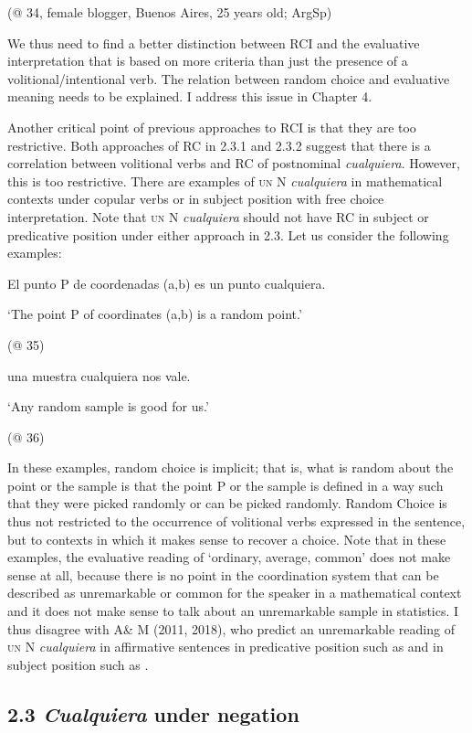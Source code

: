 \documentclass[output=paper]{langscibook}
\begin{document}
  (@ 34, female blogger, Buenos Aires, 25 years old; ArgSp)

We thus need to find a better distinction between RCI and the evaluative interpretation that is based on more criteria than just the presence of a volitional/intentional verb. The relation between random choice and evaluative meaning needs to be explained. I address this issue in Chapter 4. 

  Another critical point of previous approaches to RCI is that they are too restrictive. Both approaches of RC in 2.3.1 and 2.3.2 suggest that there is a correlation between volitional verbs and RC of postnominal \textit{cualquiera}. However, this is too restrictive. There are examples of \textsc{un} N \textit{cualquiera} in mathematical contexts under copular verbs or in subject position with free choice interpretation. Note that \textsc{un} N \textit{cualquiera} should not have RC in subject or predicative position under either approach in 2.3. Let us consider the following examples:

\label{bkm:Ref43031271}  El punto P de coordenadas (a,b) es un punto cualquiera.

  ‘The point P of coordinates (a,b) is a random point.’

  (@ 35)

\label{bkm:Ref43031168}  una muestra cualquiera nos vale.

  ‘Any random sample is good for us.’ 

  (@ 36)

In these examples, random choice is implicit; that is, what is random about the point or the sample is that the point P or the sample is defined in a way such that they were picked randomly or can be picked randomly. Random Choice is thus not restricted to the occurrence of volitional verbs expressed in the sentence, but to contexts in which it makes sense to recover a choice. Note that in these examples, the evaluative reading of ‘ordinary, average, common’ does not make sense at all, because there is no point in the coordination system that can be described as unremarkable or common for the speaker in a mathematical context and it does not make sense to talk about an unremarkable sample in statistics. I thus disagree with A\& M (2011, 2018), who predict an unremarkable reading of \textsc{un} N \textit{cualquiera} in affirmative sentences in predicative position such as  and in subject position such as .

\subsection{\textbf{2.3} \textbf{\textit{Cualquiera}} \textbf{under} \textbf{negation}}
\end{document}
